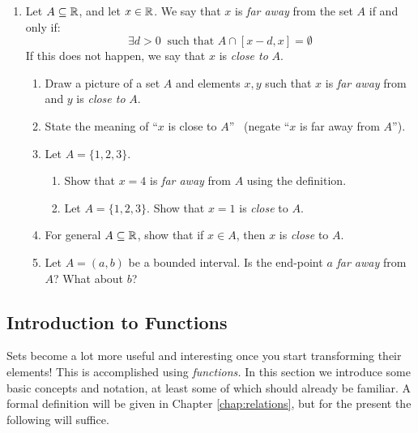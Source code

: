 \begin{exercises}{}{}
\begin{enumerate}
	
	  \item Let $A\subseteq\mathbb{R}$, and let $x\in\mathbb{R}$. We say that $x$ is \emph{far away} from the set $A$ if and only if:
	  \[
	  	\exists d>0 \ \text{ such that } A\cap[x-d,x]=\emptyset
	  \] 
		If this does not happen, we say that $x$ is \emph{close to} $A$.
  	\begin{enumerate}
			\item Draw a picture of a set $A$ and elements $x,y$ such that $x$ is \emph{far away} from and $y$ is \emph{close to} $A$. 
			\item State the meaning of ``$x$ is close to $A$'' \ (negate ``$x$ is far away from $A$'').
			\item Let $A=\{1,2,3\}$.
			\begin{enumerate}
			  \item Show that $x=4$ is \emph{far away} from $A$ using the definition.
				\item Let $A=\{1,2,3\}$. Show that $x=1$ is \emph{close} to $A$.
			\end{enumerate}
			\item For general $A\subseteq\mathbb{R}$, show that if $x\in A$, then $x$ is \emph{close} to $A$.
			\item Let $A=(a,b)$ be a bounded interval. Is the end-point $a$ \emph{far away} from $A$?  What about $b$?
  	\end{enumerate}
  	
	\end{enumerate}

\end{exercises}

\clearpage



\subsection{Introduction to Functions}\label{sec:func1}

Sets become a lot more useful and interesting once you start transforming their elements! This is accomplished using \emph{functions.} In this section we introduce some basic concepts and notation, at least some of which should already be familiar. A formal definition will be given in Chapter \ref{chap:relations}, but for the present the following will suffice.

